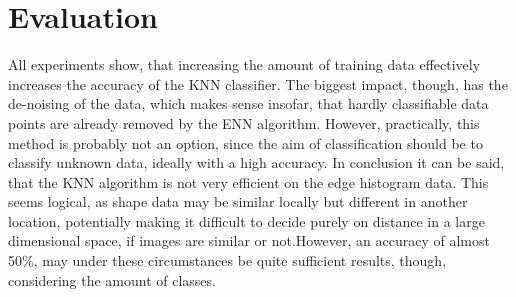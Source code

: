 \documentclass[10pt,a4paper]{proc}
\begin{document}
\section{Evaluation}
All experiments show, that increasing the amount of training data effectively increases the accuracy of the KNN classifier.
The biggest impact, though, has the de-noising of the data, which makes sense insofar, that hardly classifiable data points are already removed by the ENN algorithm. However, practically, this method is probably not an option, since the aim of classification should be to classify unknown data, ideally with a high accuracy. In conclusion it can be said, that the KNN algorithm is not very efficient on the edge histogram data. This seems logical, as shape data may be similar locally but different in another location, potentially making it difficult to decide purely on distance in a large dimensional space, if images are similar or not.However, an accuracy of almost 50\%, may under these circumstances be quite sufficient results, though, considering the amount of classes.


\twocolumn
\end{document}
